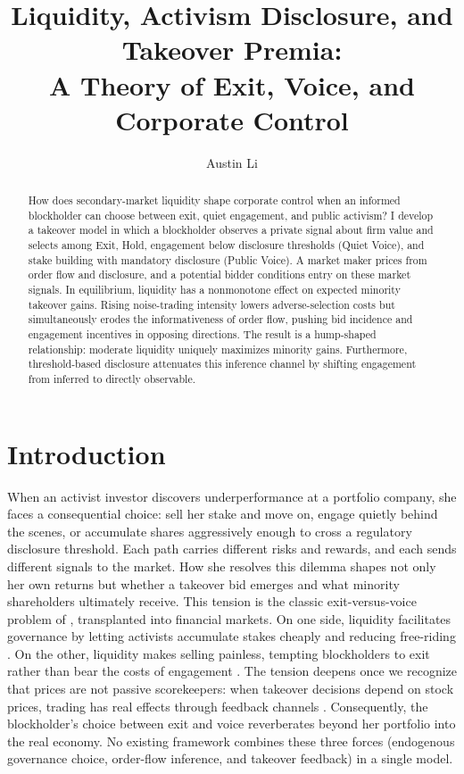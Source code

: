 \documentclass[11pt]{article}
\title{\textbf{Liquidity, Activism Disclosure, and Takeover Premia:}\\[0.3em]
\large A Theory of Exit, Voice, and Corporate Control}
\author{Austin Li\\[0.25em]}
\date{}
\newcommand{\1}{\mathbf{1}}
\begin{document}
\maketitle


\begin{abstract}
\noindent How does secondary-market liquidity shape corporate control when an informed blockholder can choose between exit, quiet engagement, and public activism? I develop a takeover model in which a blockholder observes a private signal about firm value and selects among Exit, Hold, engagement below disclosure thresholds (Quiet Voice), and stake building with mandatory disclosure (Public Voice). A market maker prices from order flow and disclosure, and a potential bidder conditions entry on these market signals. In equilibrium, liquidity has a nonmonotone effect on expected minority takeover gains. Rising noise-trading intensity lowers adverse-selection costs but simultaneously erodes the informativeness of order flow, pushing bid incidence and engagement incentives in opposing directions. The result is a hump-shaped relationship: moderate liquidity uniquely maximizes minority gains. Furthermore, threshold-based disclosure attenuates this inference channel by shifting engagement from inferred to directly observable.
\end{abstract}

\newpage

\section{Introduction}

When an activist investor discovers underperformance at a portfolio company, she faces a consequential choice: sell her stake and move on, engage quietly behind the scenes, or accumulate shares aggressively enough to cross a regulatory disclosure threshold. Each path carries different risks and rewards, and each sends different signals to the market. How she resolves this dilemma shapes not only her own returns but whether a takeover bid emerges and what minority shareholders ultimately receive. This tension is the classic exit-versus-voice problem of \citet{Hirschman1970}, transplanted into financial markets. On one side, liquidity facilitates governance by letting activists accumulate stakes cheaply and reducing free-riding \citep{Maug1998}. On the other, liquidity makes selling painless, tempting blockholders to exit rather than bear the costs of engagement \citep{Coffee1991,Bhide1993}. The tension deepens once we recognize that prices are not passive scorekeepers: when takeover decisions depend on stock prices, trading has real effects through feedback channels \citep{BondEdmansGoldstein2012,EdmansGoldsteinJiang2012}. Consequently, the blockholder's choice between exit and voice reverberates beyond her portfolio into the real economy. No existing framework combines these three forces (endogenous governance choice, order-flow inference, and takeover feedback) in a single model.
\end{document}
